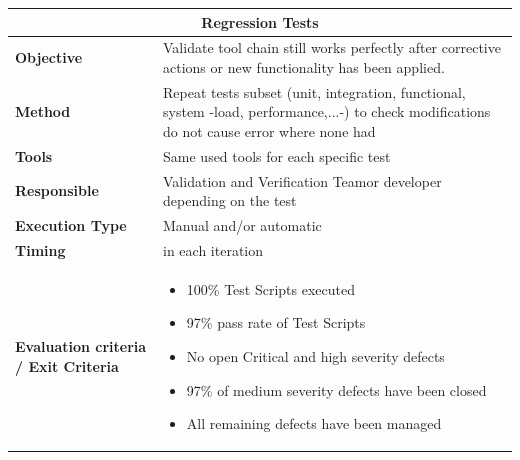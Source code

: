 \begin{center}
\begin{longtable}[H]{|p{4cm}|p{9cm}|}\hline
\multicolumn{2}{|c|}{\textbf{Regression Tests}}\\\hline
\textbf{Objective} &  Validate tool chain still works perfectly after corrective actions or new functionality has been applied.\\\hline
\textbf{Method} & Repeat tests subset (unit, integration, functional, system -load, performance,...-) to check modifications do not cause error where none had \\\hline
\textbf{Tools} & Same used tools for each specific test\\\hline
\textbf{Responsible} & Validation and Verification Teamor developer depending on the test\\\hline
\textbf{Execution Type} & Manual and/or automatic\\\hline
\textbf{Timing} & in each iteration \\\hline
\textbf{Evaluation criteria / Exit Criteria} & \begin{itemize}
\item 100\% Test Scripts executed
\item 97\% pass rate of Test Scripts
\item No open Critical and high severity defects
\item 97\% of medium severity defects have been closed 
\item All remaining defects have been managed
\end{itemize} \\\hline
\end{longtable}
\end{center}

